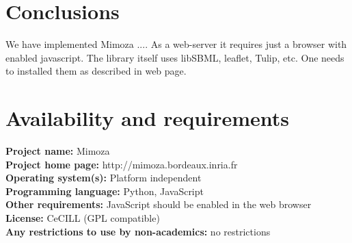 \documentclass{bmcart}
\begin{document}

\section*{Conclusions}
We have implemented Mimoza .... As a web-server it requires just a browser with enabled javascript. The library itself uses libSBML, leaflet, Tulip, etc. One needs to installed them as described in web page.


\section*{Availability and requirements}
\textbf{Project name:} Mimoza\\
\textbf{Project home page:} http://mimoza.bordeaux.inria.fr\\
\textbf{Operating system(s):} Platform independent\\
\textbf{Programming language:} Python, JavaScript\\
\textbf{Other requirements:} JavaScript should be enabled in the web browser\\
\textbf{License:} CeCILL (GPL compatible)\\
\textbf{Any restrictions to use by non-academics:} no restrictions

\end{document}
